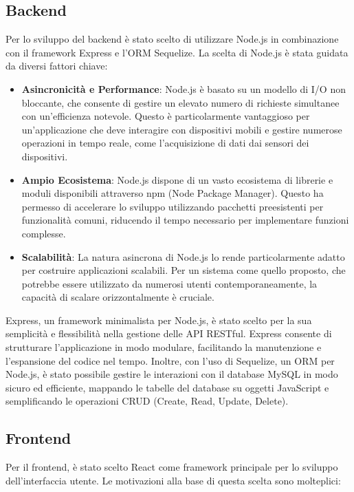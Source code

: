 \documentclass[twoside]{supsistudent}
\begin{document}
\subsection{Backend}

Per lo sviluppo del backend è stato scelto di utilizzare Node.js in combinazione con il framework Express e l'ORM Sequelize. La scelta di Node.js è stata guidata da diversi fattori chiave:

\begin{itemize}
  \item \textbf{Asincronicità e Performance}: Node.js è basato su un modello di I/O non bloccante, che consente di gestire un elevato numero di richieste simultanee con un'efficienza notevole. Questo è particolarmente vantaggioso per un'applicazione che deve interagire con dispositivi mobili e gestire numerose operazioni in tempo reale, come l'acquisizione di dati dai sensori dei dispositivi.
  \item \textbf{Ampio Ecosistema}: Node.js dispone di un vasto ecosistema di librerie e moduli disponibili attraverso npm (Node Package Manager). Questo ha permesso di accelerare lo sviluppo utilizzando pacchetti preesistenti per funzionalità comuni, riducendo il tempo necessario per implementare funzioni complesse.
  \item \textbf{Scalabilità}: La natura asincrona di Node.js lo rende particolarmente adatto per costruire applicazioni scalabili. Per un sistema come quello proposto, che potrebbe essere utilizzato da numerosi utenti contemporaneamente, la capacità di scalare orizzontalmente è cruciale.
\end{itemize}

Express, un framework minimalista per Node.js, è stato scelto per la sua semplicità e flessibilità nella gestione delle API RESTful. Express consente di strutturare l'applicazione in modo modulare, facilitando la manutenzione e l'espansione del codice nel tempo. Inoltre, con l'uso di Sequelize, un ORM per Node.js, è stato possibile gestire le interazioni con il database MySQL in modo sicuro ed efficiente, mappando le tabelle del database su oggetti JavaScript e semplificando le operazioni CRUD (Create, Read, Update, Delete).

\subsection{Frontend}

Per il frontend, è stato scelto React come framework principale per lo sviluppo dell'interfaccia utente. Le motivazioni alla base di questa scelta sono molteplici:
\end{document}
